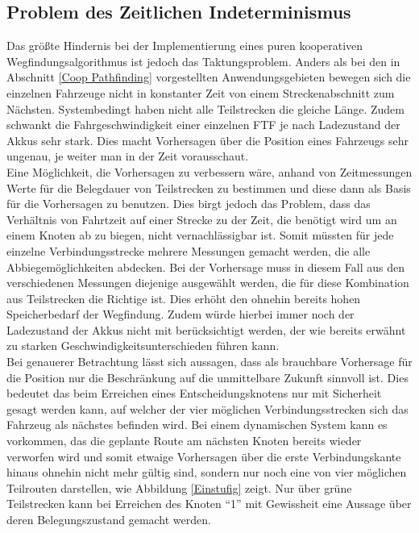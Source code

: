 	\subsection{Problem des Zeitlichen Indeterminismus}
		\label{Zeitproblem}
		Das größte Hindernis bei der Implementierung eines puren kooperativen Wegfindungsalgorithmus ist jedoch das Taktungsproblem. Anders als bei den in Abschnitt \ref{Coop Pathfinding} vorgestellten Anwendungsgebieten bewegen sich die einzelnen Fahrzeuge nicht in konstanter Zeit von einem Streckenabschnitt zum Nächsten. Systembedingt haben nicht alle Teilstrecken die gleiche Länge. Zudem schwankt die Fahrgeschwindigkeit einer einzelnen \ac{FTF} je nach Ladezustand der Akkus sehr stark. Dies macht Vorhersagen über die Position eines Fahrzeugs sehr ungenau, je weiter man in der Zeit vorausschaut.
		\\[4pt]
		Eine Möglichkeit, die Vorhersagen zu verbessern wäre, anhand von Zeitmessungen Werte für die Belegdauer von Teilstrecken zu bestimmen und diese dann als Basis für die Vorhersagen zu benutzen. Dies birgt jedoch das Problem, dass das Verhältnis von Fahrtzeit auf einer Strecke zu der Zeit, die benötigt wird um an einem Knoten ab zu biegen, nicht vernachlässigbar ist. Somit müssten für jede einzelne Verbindungsstrecke mehrere Messungen gemacht werden, die alle Abbiegemöglichkeiten abdecken. Bei der Vorhersage muss in diesem Fall aus den verschiedenen Messungen diejenige ausgewählt werden, die für diese Kombination aus Teilstrecken die Richtige ist. Dies erhöht den ohnehin bereits hohen Speicherbedarf der Wegfindung. Zudem würde hierbei immer noch der Ladezustand der Akkus nicht mit berücksichtigt werden, der wie bereits erwähnt zu starken Geschwindigkeitsunterschieden führen kann.
		\\[4pt]
		Bei genauerer Betrachtung lässt sich aussagen, dass als brauchbare Vorhersage für die Position nur die Beschränkung auf die unmittelbare Zukunft sinnvoll ist. Dies bedeutet das beim Erreichen eines Entscheidungsknotens nur mit Sicherheit gesagt werden kann, auf welcher der vier möglichen Verbindungsstrecken sich das Fahrzeug als nächstes befinden wird. Bei einem dynamischen System kann es vorkommen, das die geplante Route am nächsten Knoten bereits wieder verworfen wird und somit etwaige Vorhersagen über die erste Verbindungskante hinaus ohnehin nicht mehr gültig sind, sondern nur noch eine von vier möglichen Teilrouten darstellen, wie Abbildung \ref{Einstufig} zeigt. Nur über grüne Teilstrecken kann bei Erreichen des Knoten "`1"' mit Gewissheit eine Aussage über deren Belegungszustand gemacht werden.
		
